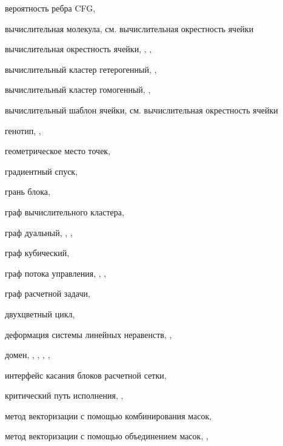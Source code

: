 вероятность ребра CFG, \pageref{term:edge_prob}

вычислительная молекула, см. вычислительная окрестность ячейки

вычислительная окрестность ячейки, \pageref{term:cell_calc_template}, \pageref{term:cell_calc_template2}, \pageref{term:cell_calc_template3}

вычислительный кластер гетерогенный, \pageref{term:cluster_getero}, \pageref{term:cluster_getero2}

вычислительный кластер гомогенный, \pageref{term:cluster_gomo}, \pageref{term:cluster_gomo2}

вычислительный шаблон ячейки, см. вычислительная окрестность ячейки

генотип, \pageref{term:genotype}, \pageref{term:genotype2}

геометрическое место точек, \pageref{term:gmt}

градиентный спуск, \pageref{term:gradient_spusk}

грань блока, \pageref{term:block_facet}

граф вычислительного кластера, \pageref{term:graph_cluster}

граф дуальный, \pageref{term:dual_graph}, \pageref{term:dual_graph2}, \pageref{term:dual_graph3}

граф кубический, \pageref{term:graph_cubic}

граф потока управления, \pageref{term:graph_cfg}, \pageref{term:graph_cfg2}, \pageref{term:graph_cfg3}

граф расчетной задачи, \pageref{term:graph_task}

двухцветный цикл, \pageref{term:bicolor_cycle}

деформация системы линейных неравенств, \pageref{term:deform_sys_lin_neravenstv}, \pageref{term:deform_sys_lin_neravenstv2}

домен, \pageref{term:domain}, \pageref{term:domain2}, \pageref{term:domain3}, \pageref{term:domain4}, \pageref{term:domain5}

интерфейс касания блоков расчетной сетки, \pageref{term:block_interface}

критический путь исполнения, \pageref{term:critical_path}, \pageref{term:critical_path2}

метод векторизации с помощью комбинирования масок, \pageref{term:meth_vec_comb}

метод векторизации с помощью объединением масок, \pageref{term:meth_vec_union}, \pageref{term:meth_vec_union2}

